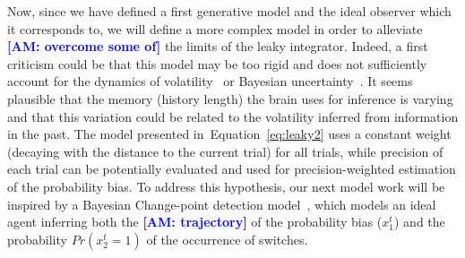 \documentclass[12pt,english]{article}%
\newcommand{\citep}[1]{\parencite{#1}}
\newcommand{\seeEq}[1]{Equation~\ref{eq:#1}}
\newcommand{\AM}[1]{\textbf{\textcolor{blue}{[AM: #1]}}}
\begin{document}
Now, since we have defined a first generative model
and the ideal observer which it corresponds to,
we will define a more complex model
in order to alleviate \AM{overcome some of} the limits of the leaky integrator.
Indeed, a first criticism could be that
this model may be too rigid and does not sufficiently
account for the dynamics of volatility~\citep{Behrens07}
or Bayesian uncertainty~\citep{Vilares2011}.
It seems plausible that the memory (history length) the brain uses
for inference is varying and that this variation could be related
to the volatility inferred from information in the past.
The model presented in~\seeEq{leaky2} uses a constant weight
(decaying with the distance to the current trial)
for all trials, while precision of each trial
can be potentially evaluated and used
for precision-weighted estimation of the probability bias.
To address this hypothesis, our next model work will be inspired
by a Bayesian Change-point detection model~\citep{AdamsMackay2007},
which models an ideal agent inferring
both the \AM{trajectory} of the probability bias ($x_1^t$)
and the probability $Pr(x_2^t=1)$ of the occurrence of switches.
\end{document}
